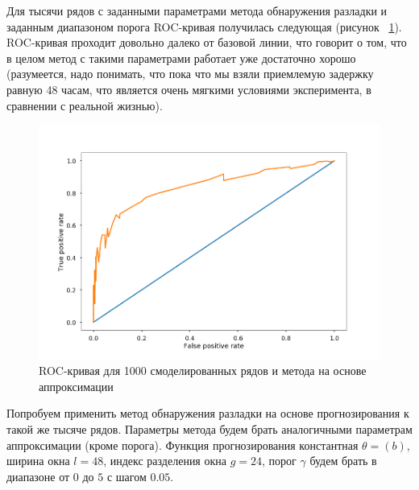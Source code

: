 \documentclass[%
12pt,
master,  %
natbib,      %
subf,        %
substylefile = spbu.rtx,
href,        %
colorlinks,  %
]{disser}
\begin{document}
Для тысячи рядов с заданными параметрами метода обнаружения разладки и заданным диапазоном порога ROC-кривая получилась следующая (рисунок ~\ref{fig:approximation_mean_2_roc}). ROC-кривая проходит довольно далеко от базовой линии, что говорит о том, что в целом метод с такими параметрами работает уже достаточно хорошо (разумеется, надо понимать, что пока что мы взяли приемлемую задержку равную 48 часам, что является очень мягкими условиями эксперимента, в сравнении с реальной жизнью). 



\begin{figure}[!hhh]
	\begin{center}
		\includegraphics[width=12cm]{approximation_mean_2_roc}
	\end{center}
	\vspace{-5mm}\caption{ROC-кривая для 1000 смоделированных рядов и метода на основе аппроксимации}
	\label{fig:approximation_mean_2_roc}
\end{figure}

Попробуем применить метод обнаружения разладки на основе прогнозирования к такой же тысяче рядов. Параметры метода будем брать аналогичными параметрам аппроксимации (кроме порога). 
Функция прогнозирования константная $\theta = (b)$, ширина окна $l = 48$, индекс разделения окна $g = 24$, порог $\gamma$ будем брать в диапазоне от $0$ до $5$ с шагом $0.05$.
\end{document}
